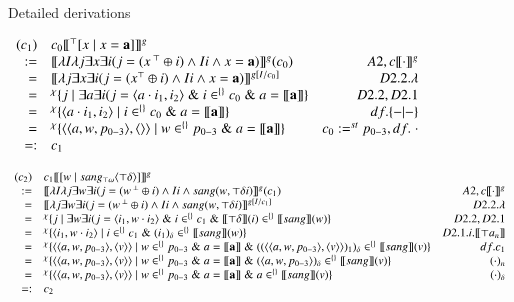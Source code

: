 \documentclass{article}
\renewcommand{\llbracket}{[\![}
\renewcommand{\rrbracket}{]\!]}
\newcommand{\tw}{\top\omega}
\newcommand{\td}{\top\delta}
\newcommand{\sang}{^{\{\}}\llbracket sang\rrbracket}
\begin{document}
\vspace{5mm}
Detailed derivations

\vspace{5mm}
$\begin{array}{rlr}
(c_1) & \multicolumn{2}{l}{c_0\llbracket ^{\top}[x\;|\;x=\mathbf{a}]\rrbracket^g} \\
:= & \llbracket\lambda I\lambda j\exists x\exists i(j=(x \,^{\top}\oplus i)\wedge Ii\wedge x=\mathbf{a})\rrbracket^g(c_0) & A2,c\llbracket\cdot\rrbracket^g \\
= & \llbracket\lambda j\exists x\exists i(j=(x ^{\top}\oplus i)\wedge Ii\wedge x=\mathbf{a})\rrbracket^{g[I/c_0]} & D2.2.\lambda \\
= & ^{\chi}\{j\;|\;\exists a\exists i(j=\langle a\cdot i_1,i_2\rangle\;\&\; i\in ^{\{\}}c_0\;\&\; a=\llbracket\mathbf{a}\rrbracket\} & D2.2,D2.1 \\
= & ^{\chi}\{\langle a\cdot i_1,i_2\rangle\;|\; i\in ^{\{\}}c_0\;\&\; a=\llbracket\mathbf{a}\rrbracket\} & df.\{-|-\} \\
= & ^{\chi}\{\langle\langle a,w,p_{0-3}\rangle,\langle\rangle\rangle\;|\; w\in ^{\{\}}p_{0-3}\;\&\; a=\llbracket\mathbf{a}\rrbracket\} & c_0:= ^{st}p_{0-3},df.\;\cdot \\
=: & c_1 & \\
\end{array}$

\vspace{5mm}
$\begin{array}{rlr}
(c_2) & \multicolumn{2}{l}{c_1\llbracket [w\;|\;sang_{\tw}\langle\td\rangle]\rrbracket^g} \\
:= & \llbracket\lambda I\lambda j\exists w\exists i(j=(w \,^{\bot}\oplus i)\wedge Ii\wedge sang(w,\td i)\rrbracket^g(c_1) & A2,c\llbracket\cdot\rrbracket^g \\
= & \llbracket\lambda j\exists w\exists i(j=(w \,^{\bot}\oplus i)\wedge Ii\wedge sang(w,\td i)\rrbracket^{g[I/c_1]} & D2.2.\lambda \\
= & ^{\chi}\{j\;|\;\exists w\exists i(j=\langle i_1,w\cdot i_2\rangle \;\&\; i\in ^{\{\}}c_1 \;\&\; \llbracket\td\rrbracket(i)\in \sang(w)\} & D2.2,D2.1 \\
= & ^{\chi}\{\langle i_1,w\cdot i_2\rangle\;|\;i\in ^{\{\}}c_1 \;\&\; (i_1)_{\delta}\in \sang(w)\} & D2.1.i.\llbracket\top a_n\rrbracket \\
= & ^{\chi}\{\langle\langle a,w,p_{0-3}\rangle,\langle v\rangle\rangle \;|\;w\in ^{\{\}}p_{0-3}\;\&\; a=\llbracket\mathbf{a}\rrbracket\;\&\; ((\langle\langle a,w,p_{0-3}\rangle,\langle v\rangle\rangle)_1)_{\delta}\in \sang(v)\} & df. c_1 \\
= & ^{\chi}\{\langle\langle a,w,p_{0-3}\rangle,\langle v\rangle\rangle \;|\;w\in ^{\{\}}p_{0-3}\;\&\; a=\llbracket\mathbf{a}\rrbracket\;\&\; (\langle a,w,p_{0-3}\rangle)_{\delta}\in \sang(v)\} & (\cdot)_n \\
= & ^{\chi}\{\langle\langle a,w,p_{0-3}\rangle,\langle v\rangle\rangle \;|\;w\in ^{\{\}}p_{0-3}\;\&\; a=\llbracket\mathbf{a}\rrbracket\;\&\; a\in \sang(v)\} & (\cdot)_{\delta} \\
=: & c_2 & \\
\end{array}$
\end{document}
